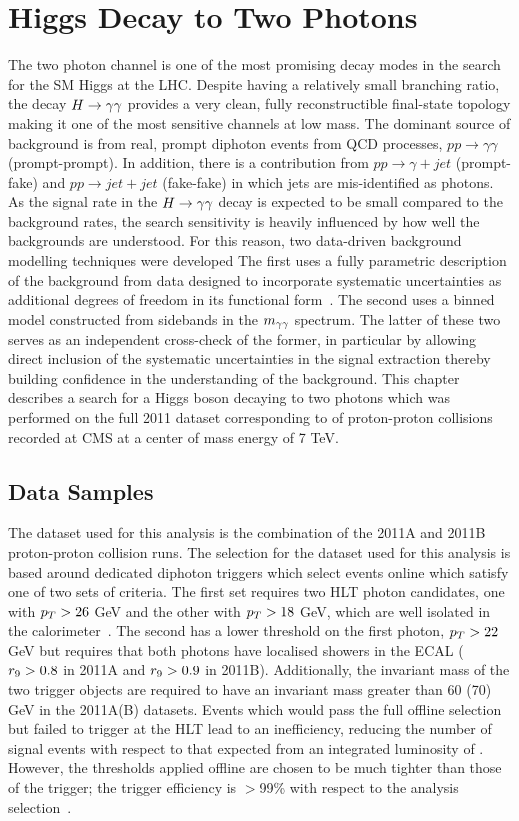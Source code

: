 \chapter{Higgs Decay to Two Photons}

The two photon channel is one of the most promising decay modes in the search for the SM Higgs
at the LHC. Despite having a relatively small branching ratio, the decay $H\rightarrow\gamma\gamma$ 
provides a very clean, fully reconstructible final-state topology making it 
one of the most sensitive channels at low mass.
The dominant source of background is from real, prompt diphoton events from QCD 
processes, $pp\rightarrow\gamma\gamma$ (prompt-prompt).
In addition, there is a contribution from $pp\rightarrow\gamma+jet$ (prompt-fake) and 
$pp\rightarrow jet+jet$ (fake-fake) in which jets are mis-identified as photons. 
As the signal rate in the $H\rightarrow\gamma\gamma$ decay is expected to be small compared to the background rates,
the search sensitivity is heavily influenced by how well the backgrounds are understood.
For this reason, two data-driven background modelling techniques were developed
The first uses a fully parametric
description of the background from data designed to incorporate systematic uncertainties as additional degrees of 
freedom in its functional form~\cite{HIG-11-033}. The second uses a binned model constructed from 
sidebands in the $m_{\gamma\gamma}$ spectrum. The latter of these two serves as an independent cross-check of the former,
in particular by allowing direct inclusion of the systematic uncertainties in the signal extraction thereby
building confidence in the understanding of the background. 
This chapter describes a search for a Higgs boson decaying to two photons
which was performed on the full 2011 dataset corresponding to \clumi of proton-proton collisions 
recorded at CMS at a center of mass energy of 7 TeV.

\section{Data Samples}
\label{sec:datasamples}

The dataset used for this analysis is the combination of the 2011A and 2011B 
proton-proton collision runs.
The selection for the dataset used for this analysis is based around dedicated diphoton triggers
which select events online which satisfy one of two sets of criteria.
The first set requires two HLT photon candidates, one with $p_{T}>26$ GeV and the other with 
$p_{T}>18$ GeV, which are well isolated in the calorimeter~\cite{AN-12-048}. The second has a lower threshold on
the first photon, $p_{T}>22$ GeV but requires that both photons have localised showers in the ECAL 
($r_{9}>0.8$ in 2011A and $r_{9}>0.9$ in 2011B). 
Additionally, the invariant mass of the two trigger objects are required to have an 
invariant mass greater than 60 (70) GeV in the 2011A(B) datasets.
Events which would pass the full offline selection but failed to trigger at the HLT lead to an inefficiency, 
reducing the number of signal events with respect to that expected from an integrated luminosity of \clumi.
However, the thresholds applied offline are chosen to be much tighter than those of the trigger;
the trigger efficiency is $>$99\% with respect to the analysis selection~\cite{AN-12-048}. 

